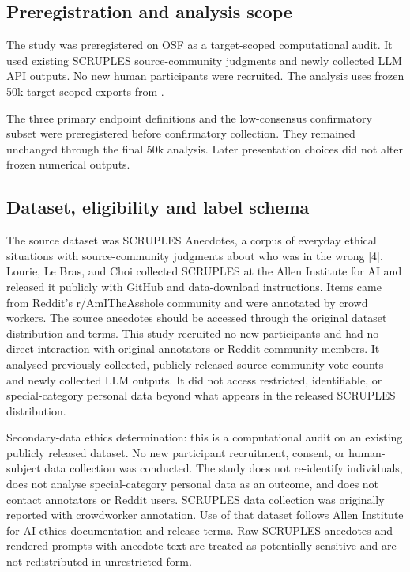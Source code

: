 \documentclass[11pt]{article}
\begin{document}
\subsection{Preregistration and analysis scope}

The study was preregistered on OSF as a target-scoped computational audit. It used existing SCRUPLES source-community judgments and newly collected LLM API outputs. No new human participants were recruited. The analysis uses frozen 50k target-scoped exports from .

The three primary endpoint definitions and the low-consensus confirmatory subset were preregistered before confirmatory collection. They remained unchanged through the final 50k analysis. Later presentation choices did not alter frozen numerical outputs.


\subsection{Dataset, eligibility and label schema}

The source dataset was SCRUPLES Anecdotes, a corpus of everyday ethical situations with source-community judgments about who was in the wrong [4]. Lourie, Le Bras, and Choi collected SCRUPLES at the Allen Institute for AI and released it publicly with GitHub and data-download instructions. Items came from Reddit's r/AmITheAsshole community and were annotated by crowd workers. The source anecdotes should be accessed through the original dataset distribution and terms. This study recruited no new participants and had no direct interaction with original annotators or Reddit community members. It analysed previously collected, publicly released source-community vote counts and newly collected LLM outputs. It did not access restricted, identifiable, or special-category personal data beyond what appears in the released SCRUPLES distribution.

Secondary-data ethics determination: this is a computational audit on an existing publicly released dataset. No new participant recruitment, consent, or human-subject data collection was conducted. The study does not re-identify individuals, does not analyse special-category personal data as an outcome, and does not contact annotators or Reddit users. SCRUPLES data collection was originally reported with crowdworker annotation. Use of that dataset follows Allen Institute for AI ethics documentation and release terms. Raw SCRUPLES anecdotes and rendered prompts with anecdote text are treated as potentially sensitive and are not redistributed in unrestricted form.
\end{document}

